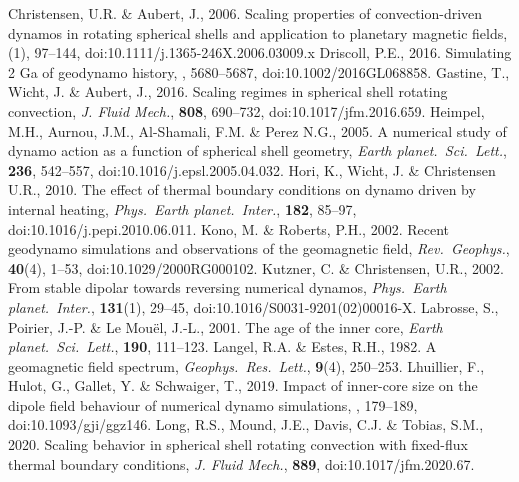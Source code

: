 \begin{thebibliography}{}
%
Christensen, U.R. \& Aubert, J., 2006. Scaling properties of convection-driven dynamos in rotating spherical shells and application to planetary magnetic fields, (1), 97--144, doi:10.1111/j.1365-246X.2006.03009.x
%
Driscoll, P.E., 2016. Simulating 2 Ga of geodynamo history, , 5680--5687, doi:10.1002/2016GL068858.
%
Gastine, T., Wicht, J. \& Aubert, J., 2016. Scaling regimes in spherical shell rotating convection, {\it J. Fluid Mech.}, {\bf 808}, 690--732, doi:10.1017/jfm.2016.659.
%
Heimpel, M.H., Aurnou, J.M., Al-Shamali, F.M. \& Perez N.G., 2005. A numerical study of dynamo action as a function of spherical shell geometry, {\it Earth planet.\ Sci.\ Lett.}, {\bf 236}, 542--557, doi:10.1016/j.epsl.2005.04.032.
%
Hori, K., Wicht, J. \& Christensen U.R., 2010. The effect of thermal boundary conditions on dynamo driven by internal heating, {\it Phys.\ Earth planet.\ Inter.}, {\bf 182}, 85--97, doi:10.1016/j.pepi.2010.06.011.
%
Kono, M. \& Roberts, P.H., 2002. Recent geodynamo simulations and observations of the geomagnetic field, {\it Rev.\ Geophys.}, {\bf 40}(4), 1--53, doi:10.1029/2000RG000102.
%
Kutzner, C. \& Christensen, U.R., 2002. From stable dipolar towards reversing numerical dynamos, {\it Phys.\ Earth planet.\ Inter.}, {\bf 131}(1), 29--45, doi:10.1016/S0031-9201(02)00016-X.
%
Labrosse, S., Poirier, J.-P. \& Le Mou{\"e}l, J.-L., 2001. The age of the inner core, {\it Earth planet.\ Sci.\ Lett.}, {\bf 190}, 111--123.
%
Langel, R.A. \& Estes, R.H., 1982. A geomagnetic field spectrum, {\it Geophys.\ Res.\ Lett.}, {\bf 9}(4), 250--253.
%
Lhuillier, F., Hulot, G., Gallet, Y. \& Schwaiger, T., 2019. Impact of inner-core size on the dipole field behaviour of numerical dynamo simulations, , 179--189, doi:10.1093/gji/ggz146.
%
Long, R.S., Mound, J.E., Davis, C.J. \& Tobias, S.M., 2020. Scaling behavior in spherical shell rotating convection with fixed-flux thermal boundary conditions, {\it J. Fluid Mech.}, {\bf 889}, doi:10.1017/jfm.2020.67.

\end{thebibliography}
